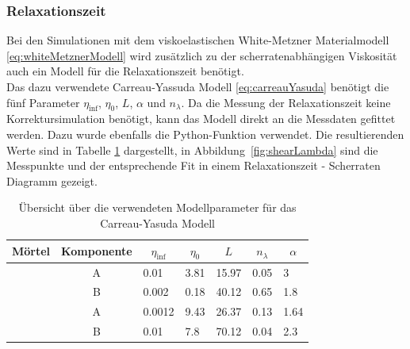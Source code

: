 \subsubsection{Relaxationszeit}
Bei den Simulationen mit dem viskoelastischen White-Metzner Materialmodell \eqref{eq:whiteMetznerModell} wird zusätzlich zu der scherratenabhängigen Viskosität auch ein Modell für die Relaxationszeit benötigt.\\
Das dazu verwendete Carreau-Yassuda Modell \eqref{eq:carreauYasuda} benötigt die fünf Parameter $\eta_{\inf}$, $\eta_0$, $L$, $\alpha$ und $n_{\lambda}$. Da die Messung der Relaxationszeit keine Korrektursimulation benötigt, kann das Modell direkt an die Messdaten gefittet werden.
Dazu wurde ebenfalls die Python-Funktion  verwendet. Die resultierenden Werte sind in Tabelle \ref{fig:relaxParameter} dargestellt, in Abbildung~\ref{fig:shearLambda} sind die Messpunkte und der entsprechende Fit in einem Relaxationszeit - Scherraten Diagramm gezeigt.
\begin{table}
    \centering
    \begin{tabular}{l c l l l l l}
        \textbf{Mörtel} & 
        \textbf{Komponente} & 
        \multicolumn{1}{c}{$\eta_{\inf}$} & 
        \multicolumn{1}{c}{$\eta_0$} &
        \multicolumn{1}{c}{$L$} & 
        \multicolumn{1}{c}{$n_{\lambda}$} & 
        \multicolumn{1}{c}{$\alpha$} \\
        \hline
        \hline
        \multirow{2}{*}{\hit{}} & A & 0.01   & 3.81  & 15.97 & 0.05 & 3       \\ 
                                & B & 0.002  & 0.18  & 40.12 & 0.65 & 1.8     \\ 
        \hline
        \multirow{2}{*}{\re{}}  & A & 0.0012 & 9.43 & 26.37  & 0.13 & 1.64    \\ 
                                & B & 0.01   & 7.8  & 70.12  & 0.04 & 2.3         
    \end{tabular}
    \caption{Übersicht über die verwendeten Modellparameter für das Carreau-Yasuda Modell}
    \label{fig:relaxParameter}
\end{table}
%
